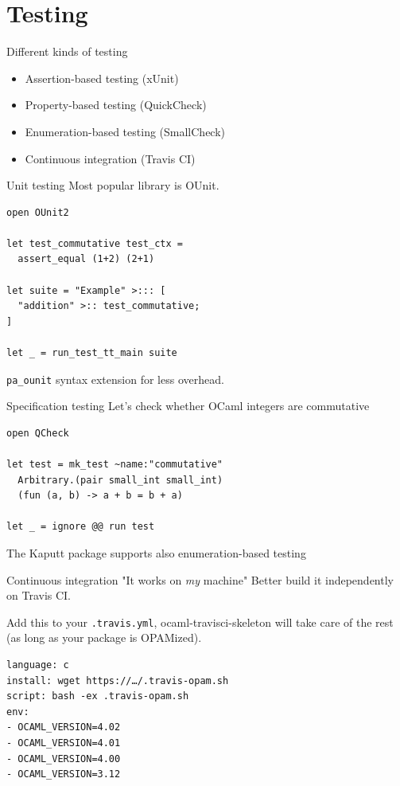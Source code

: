 \documentclass{beamer}
\begin{document}
\section{Testing}

\begin{frame}{Different kinds of testing}
  \begin{itemize}
    \item Assertion-based testing (xUnit)
    \item Property-based testing (QuickCheck)
    \item Enumeration-based testing (SmallCheck)
    \item Continuous integration (Travis CI)
  \end{itemize}
\end{frame}

\begin{frame}[fragile]{Unit testing}
  Most popular library is OUnit.
  \begin{verbatim}
open OUnit2

let test_commutative test_ctx =
  assert_equal (1+2) (2+1)

let suite = "Example" >::: [
  "addition" >:: test_commutative;
]

let _ = run_test_tt_main suite
  \end{verbatim}
  \texttt{pa\_ounit} syntax extension for less overhead.
\end{frame}

\begin{frame}[fragile]{Specification testing}
  Let's check whether OCaml integers are commutative
  \begin{verbatim}
open QCheck

let test = mk_test ~name:"commutative"
  Arbitrary.(pair small_int small_int)
  (fun (a, b) -> a + b = b + a)

let _ = ignore @@ run test
  \end{verbatim}
  The Kaputt package supports also enumeration-based testing
\end{frame}

\begin{frame}[fragile]{Continuous integration}
  "It works on \emph{my} machine" \pause Better build it independently on Travis CI.

  Add this to your \texttt{.travis.yml}, ocaml-travisci-skeleton will take care of
  the rest (as long as your package is OPAMized).
  \begin{verbatim}
language: c
install: wget https://…/.travis-opam.sh
script: bash -ex .travis-opam.sh
env:
- OCAML_VERSION=4.02
- OCAML_VERSION=4.01
- OCAML_VERSION=4.00
- OCAML_VERSION=3.12
  \end{verbatim}
\end{frame}
\end{document}
